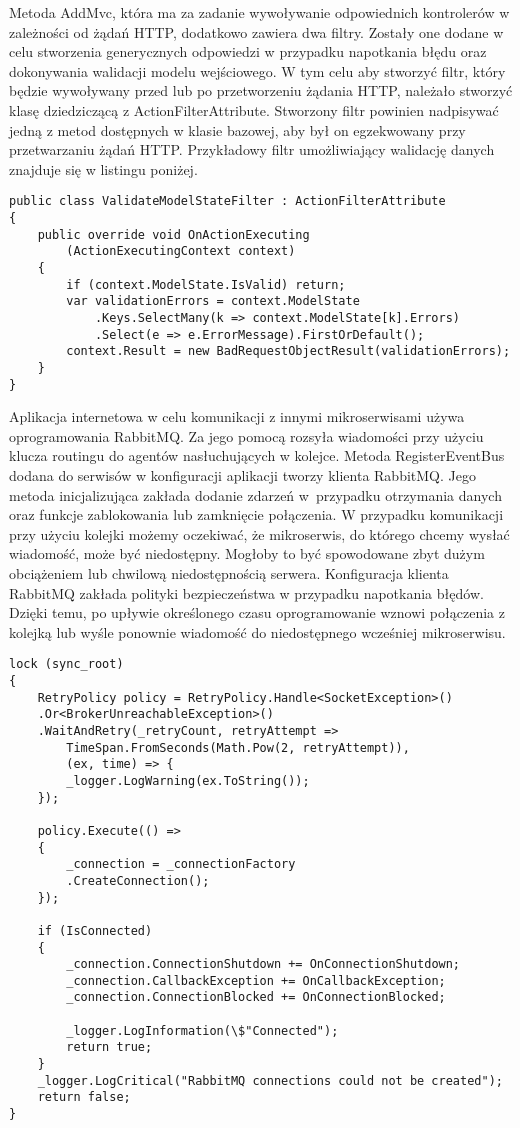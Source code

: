 Metoda AddMvc, która ma za zadanie wywoływanie odpowiednich kontrolerów w zależności od żądań HTTP, dodatkowo zawiera dwa filtry. Zostały one dodane w celu stworzenia generycznych odpowiedzi w przypadku napotkania błędu oraz dokonywania walidacji modelu wejściowego. W tym celu aby stworzyć filtr, który będzie wywoływany przed lub po przetworzeniu żądania HTTP, należało stworzyć klasę dziedziczącą z ActionFilterAttribute. Stworzony filtr powinien nadpisywać jedną z metod dostępnych w klasie bazowej, aby był on egzekwowany przy przetwarzaniu żądań HTTP. Przykładowy filtr umożliwiający walidację danych znajduje się w listingu poniżej.

\begin{lstlisting}[caption={Stworzenie obiektów odwróconego sterowania.},label={dependencyInjectionAndConfiguration} ]
 public class ValidateModelStateFilter : ActionFilterAttribute
{
	public override void OnActionExecuting
		(ActionExecutingContext context)
	{
		if (context.ModelState.IsValid) return;		
		var validationErrors = context.ModelState
			.Keys.SelectMany(k => context.ModelState[k].Errors)
			.Select(e => e.ErrorMessage).FirstOrDefault();		
		context.Result = new BadRequestObjectResult(validationErrors);
	}
}
\end{lstlisting}

Aplikacja internetowa w celu komunikacji z innymi mikroserwisami używa oprogramowania RabbitMQ. Za jego pomocą rozsyła wiadomości przy użyciu klucza routingu do agentów nasłuchujących w kolejce. Metoda RegisterEventBus dodana do serwisów w konfiguracji aplikacji tworzy klienta RabbitMQ. Jego metoda inicjalizująca zakłada dodanie zdarzeń w~przypadku otrzymania danych oraz funkcje zablokowania lub zamknięcie połączenia. W przypadku komunikacji przy użyciu kolejki możemy oczekiwać, że mikroserwis, do którego chcemy wysłać wiadomość, może być niedostępny. Mogłoby to być spowodowane zbyt dużym obciążeniem lub chwilową niedostępnością serwera. Konfiguracja klienta RabbitMQ zakłada polityki bezpieczeństwa w przypadku napotkania błędów. Dzięki temu, po upływie określonego czasu oprogramowanie wznowi połączenia z kolejką lub wyśle ponownie wiadomość do niedostępnego wcześniej mikroserwisu.
\newpage

\begin{lstlisting}[caption={Metoda połączenia klienta RabbitMQ.} ]
lock (sync_root)
{
	RetryPolicy policy = RetryPolicy.Handle<SocketException>()
	.Or<BrokerUnreachableException>()
	.WaitAndRetry(_retryCount, retryAttempt => 
		TimeSpan.FromSeconds(Math.Pow(2, retryAttempt)), 
		(ex, time) => {
		_logger.LogWarning(ex.ToString());
	});
	
	policy.Execute(() =>
	{
		_connection = _connectionFactory
		.CreateConnection();
	});
	
	if (IsConnected)
	{
		_connection.ConnectionShutdown += OnConnectionShutdown;
		_connection.CallbackException += OnCallbackException;
		_connection.ConnectionBlocked += OnConnectionBlocked;
		
		_logger.LogInformation(\$"Connected");		
		return true;
	}
	_logger.LogCritical("RabbitMQ connections could not be created");	
	return false;
}

\end{lstlisting}

